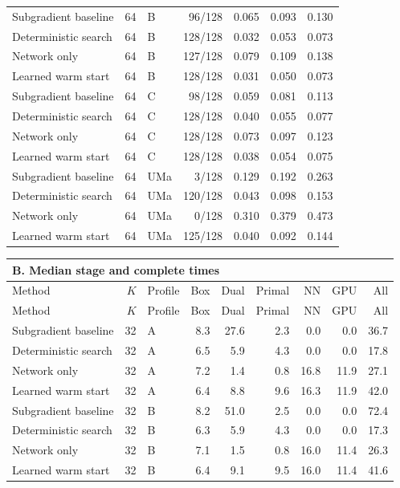 \documentclass[10pt,letterpaper]{article}
\begin{document}
\begin{longtable}{lrlrrrr}
Subgradient baseline & 64 & B & 96/128 & 0.065 & 0.093 & 0.130\\
Deterministic search & 64 & B & 128/128 & 0.032 & 0.053 & 0.073\\
Network only & 64 & B & 127/128 & 0.079 & 0.109 & 0.138\\
Learned warm start & 64 & B & 128/128 & 0.031 & 0.050 & 0.073\\
Subgradient baseline & 64 & C & 98/128 & 0.059 & 0.081 & 0.113\\
Deterministic search & 64 & C & 128/128 & 0.040 & 0.055 & 0.077\\
Network only & 64 & C & 128/128 & 0.073 & 0.097 & 0.123\\
Learned warm start & 64 & C & 128/128 & 0.038 & 0.054 & 0.075\\
Subgradient baseline & 64 & UMa & 3/128 & 0.129 & 0.192 & 0.263\\
Deterministic search & 64 & UMa & 120/128 & 0.043 & 0.098 & 0.153\\
Network only & 64 & UMa & 0/128 & 0.310 & 0.379 & 0.473\\
Learned warm start & 64 & UMa & 125/128 & 0.040 & 0.092 & 0.144\\\end{longtable}\addtocounter{table}{-1}\renewcommand{\theHtable}{\arabic{table}B}\begin{longtable}{lrlrrrrrr}\multicolumn{9}{l}{\textbf{B. Median stage and complete times}}\\\toprule Method & $K$ & Profile & Box & Dual & Primal & NN & GPU & All\\\midrule\endfirsthead\toprule Method & $K$ & Profile & Box & Dual & Primal & NN & GPU & All\\\midrule\endhead\bottomrule\endfoot
Subgradient baseline & 32 & A & 8.3 & 27.6 & 2.3 & 0.0 & 0.0 & 36.7\\
Deterministic search & 32 & A & 6.5 & 5.9 & 4.3 & 0.0 & 0.0 & 17.8\\
Network only & 32 & A & 7.2 & 1.4 & 0.8 & 16.8 & 11.9 & 27.1\\
Learned warm start & 32 & A & 6.4 & 8.8 & 9.6 & 16.3 & 11.9 & 42.0\\
Subgradient baseline & 32 & B & 8.2 & 51.0 & 2.5 & 0.0 & 0.0 & 72.4\\
Deterministic search & 32 & B & 6.3 & 5.9 & 4.3 & 0.0 & 0.0 & 17.3\\
Network only & 32 & B & 7.1 & 1.5 & 0.8 & 16.0 & 11.4 & 26.3\\
Learned warm start & 32 & B & 6.4 & 9.1 & 9.5 & 16.0 & 11.4 & 41.6\\

\end{longtable}
\end{document}
